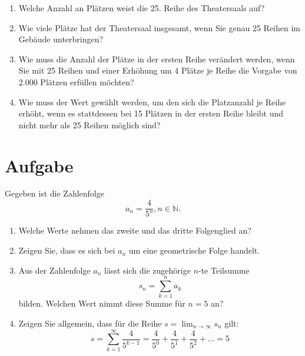 \documentclass[fontsize=11pt, parskip=half]{scrartcl}
\newcommand{\N}{\mathbb{N}}
\begin{document}
\begin{enumerate}[label=\alph*)]
\item Welche Anzahl an Plätzen weist die 25. Reihe des Theatersaals auf? 
\item Wie viele Plätze hat der Theatersaal insgesamt, wenn Sie genau 25 Reihen im Gebäude
unterbringen?
\item Wie muss die Anzahl der Plätze in der ersten Reihe verändert werden,
wenn Sie mit 25 Reihen und einer Erhöhung um 4 Plätze
je Reihe die Vorgabe von 2.000 Plätzen erfüllen möchten?
\item Wie muss der Wert gewählt werden, um den sich die Platzanzahl je Reihe erhöht, wenn es stattdessen bei 15 Plätzen in der ersten Reihe bleibt und
nicht mehr als 25 Reihen möglich sind?
\end{enumerate}

\section{Aufgabe}
Gegeben ist die Zahlenfolge $$a_n = \frac{4}{5^{n}}, n \in
\N.$$

\begin{enumerate}
\item Welche Werte nehmen das zweite und das dritte Folgenglied an?
\item Zeigen Sie, dass es sich bei $a_n$ um eine geometrische Folge handelt.
\item Aus der Zahlenfolge $a_n$ lässt sich die zugehörige $n$-te Teilsumme $$ s_n = \sum_{k=1}^{n} a_k $$ bilden. Welchen Wert nimmt diese Summe für $n=5$ an?
\item Zeigen Sie allgemein, dass für die Reihe $s = \lim_{n \rightarrow \infty}s_n$ gilt:
$$ s = \sum_{k=1}^{\infty} \frac{4}{5^{k-1}} = \frac{4}{5^0} + \frac{4}{5^1} + \frac{4}{5^2} + \ldots = 5 $$ \\[-0.5cm]
\end{enumerate}
\end{document}
